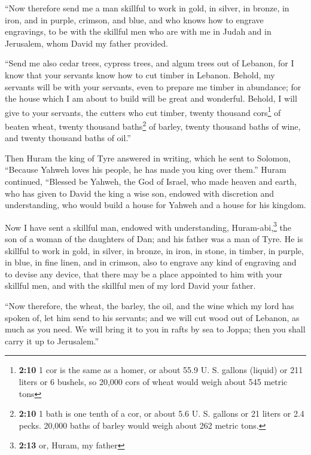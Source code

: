  ``Now therefore send me a man skillful to work in gold,
in silver, in bronze, in iron, and in purple, crimson, and blue, and who
knows how to engrave engravings, to be with the skillful men who are
with me in Judah and in Jerusalem, whom David my father provided.

 ``Send me also cedar trees, cypress trees, and algum
trees out of Lebanon, for I know that your servants know how to cut
timber in Lebanon. Behold, my servants will be with your servants,
 even to prepare me timber in abundance; for the house
which I am about to build will be great and wonderful. 
Behold, I will give to your servants, the cutters who cut timber, twenty
thousand cors\footnote{\textbf{2:10} 1 cor is the same as a homer, or
  about 55.9 U. S. gallons (liquid) or 211 liters or 6 bushels, so
  20,000 cors of wheat would weigh about 545 metric tons} of beaten
wheat, twenty thousand baths\footnote{\textbf{2:10} 1 bath is one tenth
  of a cor, or about 5.6 U. S. gallons or 21 liters or 2.4 pecks. 20,000
  baths of barley would weigh about 262 metric tons.} of barley, twenty
thousand baths of wine, and twenty thousand baths of oil.''

 Then Huram the king of Tyre answered in writing, which
he sent to Solomon, ``Because Yahweh loves his people, he has made you
king over them.''  Huram continued, ``Blessed be Yahweh,
the God of Israel, who made heaven and earth, who has given to David the
king a wise son, endowed with discretion and understanding, who would
build a house for Yahweh and a house for his kingdom.

 Now I have sent a skillful man, endowed with
understanding, Huram-abi,\footnote{\textbf{2:13} or, Huram, my father}
 the son of a woman of the daughters of Dan; and his
father was a man of Tyre. He is skillful to work in gold, in silver, in
bronze, in iron, in stone, in timber, in purple, in blue, in fine linen,
and in crimson, also to engrave any kind of engraving and to devise any
device, that there may be a place appointed to him with your skillful
men, and with the skillful men of my lord David your father.

 ``Now therefore, the wheat, the barley, the oil, and the
wine which my lord has spoken of, let him send to his servants;
 and we will cut wood out of Lebanon, as much as you
need. We will bring it to you in rafts by sea to Joppa; then you shall
carry it up to Jerusalem.''

